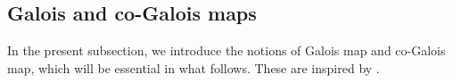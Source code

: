 \documentclass[nosumlimits,twoside]{amsart}
\theoremstyle{definition}
\theoremstyle{remark}
\begin{document}

\subsection{Galois and co-Galois maps}

In the present subsection, we introduce the notions of Galois map and co-Galois map, which will be essential in what follows. These are inspired by \cite{Bohm-Lack}.
\end{document}

